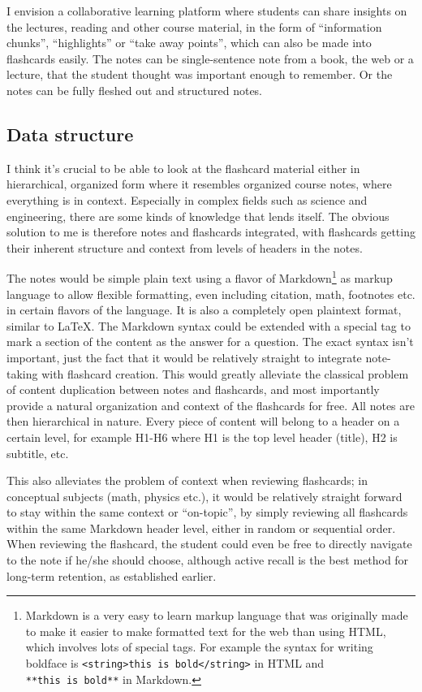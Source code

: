 I envision a collaborative learning platform where students can share
insights on the lectures, reading and other course material, in the form
of ``information chunks'', ``highlights'' or ``take away points'', which
can also be made into flashcards easily. The notes can be
single-sentence note from a book, the web or a lecture, that the student
thought was important enough to remember. Or the notes can be fully
fleshed out and structured notes.

\subsection{Data structure}\label{data-structure}

I think it's crucial to be able to look at the flashcard material either
in hierarchical, organized form where it resembles organized course
notes, where everything is in context. Especially in complex fields such
as science and engineering, there are some kinds of knowledge that lends
itself. The obvious solution to me is therefore notes and flashcards
integrated, with flashcards getting their inherent structure and context
from levels of headers in the notes.

The notes would be simple plain text using a flavor of
Markdown\footnote{Markdown is a very easy to learn markup language that
  was originally made to make it easier to make formatted text for the
  web than using HTML, which involves lots of special tags. For example
  the syntax for writing boldface is
  \texttt{\textless{}string\textgreater{}this\ is\ bold\textless{}/string\textgreater{}}
  in HTML and \texttt{**this\ is\ bold**} in Markdown.} as markup
language to allow flexible formatting, even including citation, math,
footnotes etc. in certain flavors of the language. It is also a
completely open plaintext format, similar to LaTeX. The Markdown syntax
could be extended with a special tag to mark a section of the content as
the answer for a question. The exact syntax isn't important, just the
fact that it would be relatively straight to integrate note-taking with
flashcard creation. This would greatly alleviate the classical problem
of content duplication between notes and flashcards, and most
importantly provide a natural organization and context of the flashcards
for free. All notes are then hierarchical in nature. Every piece of
content will belong to a header on a certain level, for example H1-H6
where H1 is the top level header (title), H2 is subtitle, etc.

This also alleviates the problem of context when reviewing flashcards;
in conceptual subjects (math, physics etc.), it would be relatively
straight forward to stay within the same context or ``on-topic'', by
simply reviewing all flashcards within the same Markdown header level,
either in random or sequential order. When reviewing the flashcard, the
student could even be free to directly navigate to the note if he/she
should choose, although active recall is the best method for long-term
retention, as established earlier.

